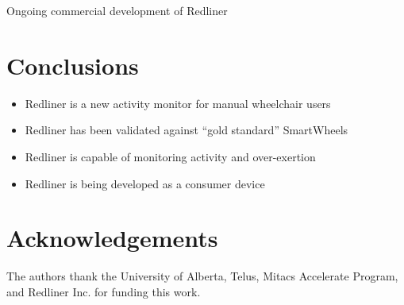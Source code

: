 \documentclass[a0,landscape]{a0poster}
\begin{document}
\begin{multicols*}{3}
\noindent
\begin{minipage}{\columnwidth}
\makeatletter
\newcommand{\@captype}{figure}
\makeatother
\centering
{}\qquad%
\caption{Ongoing commercial development of Redliner}
\end{minipage}

\section*{Conclusions}
\begin{itemize}
    \item Redliner is a new activity monitor for manual wheelchair users
    \item Redliner has been validated against ``gold standard'' SmartWheels
    \item Redliner is capable of monitoring activity and over-exertion
    \item Redliner is being developed as a consumer device
\end{itemize}

\small
\nocite{*}



\section*{Acknowledgements}
The authors thank the University of Alberta, Telus, Mitacs Accelerate Program, and Redliner Inc. for funding this work.

\end{multicols*}
\end{document}

